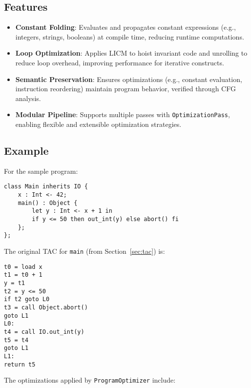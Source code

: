 \documentclass[11pt, titlepage]{article}
\begin{document}
\subsection{Features}
\begin{itemize}[leftmargin=*]
    \item \textbf{Constant Folding}: Evaluates and propagates constant expressions (e.g., integers, strings, booleans) at compile time, reducing runtime computations.
    \item \textbf{Loop Optimization}: Applies LICM to hoist invariant code and unrolling to reduce loop overhead, improving performance for iterative constructs.
    \item \textbf{Semantic Preservation}: Ensures optimizations (e.g., constant evaluation, instruction reordering) maintain program behavior, verified through CFG analysis.
    \item \textbf{Modular Pipeline}: Supports multiple passes with \texttt{OptimizationPass}, enabling flexible and extensible optimization strategies.
\end{itemize}

\subsection{Example}
For the sample program:
\begin{lstlisting}
class Main inherits IO {
    x : Int <- 42;
    main() : Object {
        let y : Int <- x + 1 in
        if y <= 50 then out_int(y) else abort() fi
    };
};
\end{lstlisting}
The original TAC for \texttt{main} (from Section~\ref{sec:tac}) is:
\begin{lstlisting}
t0 = load x
t1 = t0 + 1
y = t1
t2 = y <= 50
if t2 goto L0
t3 = call Object.abort()
goto L1
L0:
t4 = call IO.out_int(y)
t5 = t4
goto L1
L1:
return t5
\end{lstlisting}

The optimizations applied by \texttt{ProgramOptimizer} include:
\end{document}
